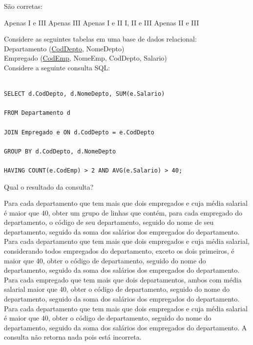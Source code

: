 \documentclass[12pt, addpoints]{exam}
\begin{document}
\begin{questions}
\begin{enumerate}[label=\Roman*.]
\end{enumerate}

São corretas:
\begin{choices}
\choice Apenas I e III
\choice Apenas III
\choice Apenas I e II
\choice I, II e III
\choice Apenas II e III
\end{choices}

\question

Considere as seguintes tabelas em uma base de dados relacional:\\

Departamento (\underline{CodDepto}, NomeDepto)\\

Empregado (\underline{CodEmp}, NomeEmp, CodDepto, Salario)\\

Considere a seguinte consulta SQL:

\begin{verbatim}

SELECT d.CodDepto, d.NomeDepto, SUM(e.Salario)

FROM Departamento d

JOIN Empregado e ON d.CodDepto = e.CodDepto

GROUP BY d.CodDepto, d.NomeDepto

HAVING COUNT(e.CodEmp) > 2 AND AVG(e.Salario) > 40;

\end{verbatim}



Qual o resultado da consulta?
\begin{choices}
\choice Para cada departamento que tem mais que dois empregados e cuja média salarial é maior que 40, obter um grupo de linhas que contém, para cada empregado do departamento, o código de seu departamento, seguido do nome de seu departamento, seguido da soma dos salários dos empregados do departamento.
\choice Para cada departamento que tem mais que dois empregados e cuja média salarial, considerando todos empregados do departamento, exceto os dois primeiros, é maior que 40, obter o código de departamento, seguido do nome do departamento, seguido da soma dos salários dos empregados do departamento.
\choice Para cada empregado que tem mais que dois departamentos, ambos com média salarial maior que 40, obter o código de departamento, seguido do nome do departamento, seguido da soma dos salários dos empregados do departamento.
\choice Para cada departamento que tem mais que dois empregados e cuja média salarial é maior que 40, obter o código de departamento, seguido do nome do departamento, seguido da soma dos salários dos empregados do departamento.
\choice A consulta não retorna nada pois está incorreta.
\end{choices}


\end{questions}
\end{document}
